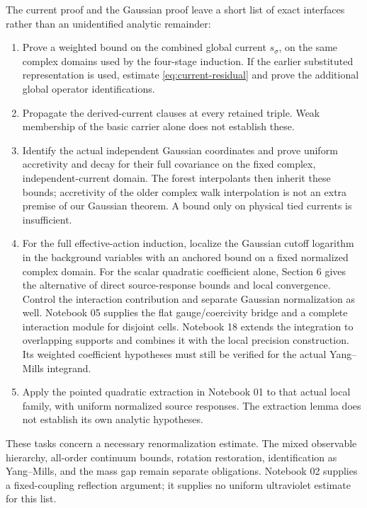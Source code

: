 \documentclass[11pt]{article}
\theoremstyle{remark}
\begin{document}
The current proof and the Gaussian proof leave a short list of exact
interfaces rather than an unidentified analytic remainder:
\begin{enumerate}
\item Prove a weighted bound on the combined global current
$s_\sigma$, on the same complex domains used by the four-stage
induction. If the earlier substituted representation is used,
estimate \eqref{eq:current-residual} and prove the additional global
operator identifications.
\item Propagate the derived-current clauses at every retained triple.
Weak membership of the basic carrier alone does not establish these.
\item Identify the actual independent Gaussian coordinates and prove
uniform accretivity and decay for their full covariance on the fixed
complex, independent-current domain. The forest interpolants then
inherit these bounds; accretivity of the older complex walk
interpolation is not an extra premise of our Gaussian theorem.
A bound only on physical tied currents is insufficient.
\item For the full effective-action induction, localize the Gaussian
cutoff logarithm in the background variables with an anchored bound
on a fixed normalized complex domain. For the scalar quadratic
coefficient alone, Section 6 gives the alternative of direct
source-response bounds and local convergence. Control the
interaction contribution and separate Gaussian normalization as well.
Notebook 05 supplies the flat gauge/coercivity bridge and a complete
interaction module for disjoint cells. Notebook 18 extends the
integration to overlapping supports and combines it with the local
precision construction. Its weighted coefficient hypotheses must
still be verified for the actual Yang--Mills integrand.
\item Apply the pointed quadratic extraction in Notebook 01 to that
actual local family, with uniform normalized source responses. The
extraction lemma does not establish its own analytic hypotheses.
\end{enumerate}

These tasks concern a necessary renormalization estimate. The mixed
observable hierarchy, all-order continuum bounds, rotation restoration,
identification as Yang--Mills, and the mass gap remain separate
obligations. Notebook 02 supplies a fixed-coupling reflection argument;
it supplies no uniform ultraviolet estimate for this list.
\end{document}
